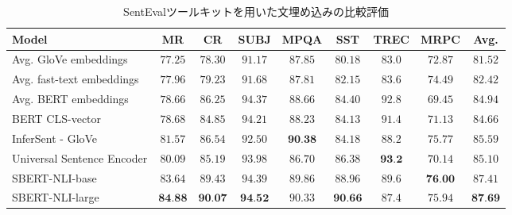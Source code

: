 \documentclass[12pt,a4j]{jreport}
\begin{document}
\begin{table}[H]
  \caption{
    SentEvalツールキットを用いた文埋め込みの比較評価
    \protect\footnotemark[9]
    }
  \vspace{3mm}
  \centering
  {\tabcolsep=0.1cm
    \begin{tabular}{l|cccccccc}
      \hline Model & MR & CR & SUBJ & MPQA & SST & TREC & MRPC & Avg. \\
      \hline Avg. GloVe embeddings & $77.25$ & $78.30$ & $91.17$ & $87.85$ & $80.18$ & $83.0$ & $72.87$ & $81.52$ \\
      Avg. fast-text embeddings & $77.96$ & $79.23$ & $91.68$ & $87.81$ & $82.15$ & $83.6$ & $74.49$ & $82.42$ \\
      Avg. BERT embeddings & $78.66$ & $86.25$ & $94.37$ & $88.66$ & $84.40$ & $92.8$ & $69.45$ & $84.94$ \\
      BERT CLS-vector & $78.68$ & $84.85$ & $94.21$ & $88.23$ & $84.13$ & $91.4$ & $71.13$ & $84.66$ \\
      InferSent - GloVe & $81.57$ & $86.54$ & $92.50$ & $\mathbf{9 0 . 3 8}$ & $84.18$ & $88.2$ & $75.77$ & $85.59$ \\
      Universal Sentence Encoder & $80.09$ & $85.19$ & $93.98$ & $86.70$ & $86.38$ & $\mathbf{9 3 . 2}$ & $70.14$ & $85.10$ \\
      \hline SBERT-NLI-base & $83.64$ & $89.43$ & $94.39$ & $89.86$ & $88.96$ & $89.6$ & $\mathbf{7 6 . 0 0}$ & $87.41$ \\
      SBERT-NLI-large & $\mathbf{8 4 . 8 8}$ & $\mathbf{9 0 . 0 7}$ & $\mathbf{9 4 . 5 2}$ & $90.33$ & $\mathbf{9 0 . 6 6}$ & $87.4$ & $75.94$ & $\mathbf{8 7 . 6 9}$ \\
      \hline
    \end{tabular}
  }  
  \label{sentence_bert_evaluation}
\end{table}

\end{document}
